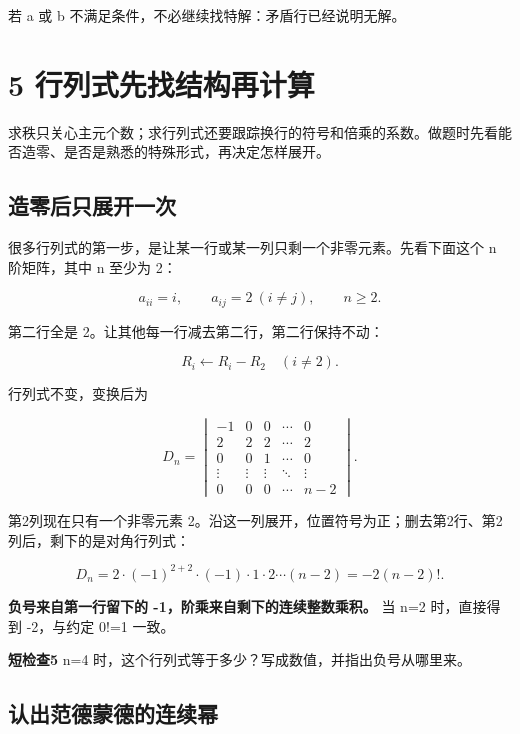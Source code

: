 \documentclass[
  11pt,
  a4paper,
  fontset=fandol]{ctexart}
\begin{document}
若 a 或 b 不满足条件，不必继续找特解：矛盾行已经说明无解。


\section{5
行列式先找结构再计算}\label{5-ux884cux5217ux5f0fux5148ux627eux7ed3ux6784ux518dux8ba1ux7b97}

求秩只关心主元个数；求行列式还要跟踪换行的符号和倍乘的系数。做题时先看能否造零、是否是熟悉的特殊形式，再决定怎样展开。


\subsection{造零后只展开一次}\label{ux9020ux96f6ux540eux53eaux5c55ux5f00ux4e00ux6b21}

很多行列式的第一步，是让某一行或某一列只剩一个非零元素。先看下面这个 n
阶矩阵，其中 n 至少为 2：

\[a_{ii}=i,\qquad a_{ij}=2\ (i\ne j),\qquad n\ge2.\]

第二行全是 2。让其他每一行减去第二行，第二行保持不动：

\[R_i\leftarrow R_i-R_2\quad(i\ne2).\]

行列式不变，变换后为

\[D_n=\begin{vmatrix}
-1&0&0&\cdots&0\\
2&2&2&\cdots&2\\
0&0&1&\cdots&0\\
\vdots&\vdots&\vdots&\ddots&\vdots\\
0&0&0&\cdots&n-2
\end{vmatrix}.\]

第2列现在只有一个非零元素
2。沿这一列展开，位置符号为正；删去第2行、第2列后，剩下的是对角行列式：

\[D_n=2\cdot(-1)^{2+2}\cdot(-1)\cdot1\cdot2\cdots(n-2)
=\boxed{-2(n-2)!}.\]

\textbf{负号来自第一行留下的 -1，阶乘来自剩下的连续整数乘积。} 当 n=2
时，直接得到 -2，与约定 0!=1 一致。

\textbf{短检查5} n=4
时，这个行列式等于多少？写成数值，并指出负号从哪里来。


\subsection{认出范德蒙德的连续幂}\label{ux8ba4ux51faux8303ux5fb7ux8499ux5fb7ux7684ux8fdeux7eedux5e42}
\end{document}
